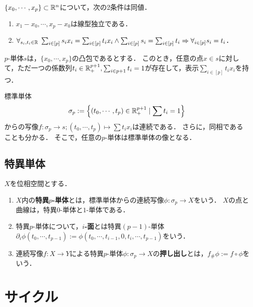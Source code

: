 \documentclass[uplatex,dvipdfmx]{jsreport}
\begin{document}
\begin{proposition}[単体の特徴付け]
    $\{x_0,\cdots,x_p\}\subset\mathbb{R}^n$について，次の2条件は同値．
    \begin{enumerate}
        \item $x_1-x_0,\cdots,x_p-x_0$は線型独立である．
        \item $\forall_{s_i,t_i\in\mathbb{R}}\;\sum_{i\in[p]}s_ix_i=\sum_{i\in[p]}t_ix_i\land\sum_{i\in[p]}s_i=\sum_{i\in[p]}t_i\Rightarrow\forall_{i\in[p]}s_i=t_i$．
    \end{enumerate}
\end{proposition}

\begin{corollary}
    $p$-単体$s$は，$\{x_0,\cdots,x_p\}$の凸包であるとする．
    このとき，任意の点$x\in s$に対して，ただ一つの係数列$t_i\in\mathbb{R}_+^{p+1},\sum_{i\in p+1}t_i=1$が存在して，表示$\sum_{i\in[p]}t_ix_i$を持つ．
\end{corollary}
\begin{remarks}
    標準単体
    \[\sigma_p:=\left\{(t_0,\cdots,t_p)\in\mathbb{R}_+^{p+1}\mid\sum t_i=1\right\}\]
    からの写像$f:\sigma_p\to s;(t_0,\cdots,t_p)\mapsto\sum t_ix_i$は連続である．
    さらに，同相であることも分かる．
    そこで，任意の$p$-単体は標準単体の像となる．
\end{remarks}

\subsection{特異単体}

\begin{definition}
    $X$を位相空間とする．
    \begin{enumerate}
        \item $X$内の\textbf{特異$p$-単体}とは，標準単体からの連続写像$\phi:\sigma_p\to X$をいう．
        $X$の点と曲線は，特異$0$-単体と$1$-単体である．
        \item 特異$p$-単体について，\textbf{$i$-面}とは特異$(p-1)$-単体$\partial_i\phi(t_0,\cdots,t_{p-1}):=\phi(t_0,\cdots,t_{i-1},0,t_i,\cdots,t_{p-1})$をいう．
        \item 連続写像$f:X\to Y$による特異$p$-単体$\phi:\sigma_p\to X$の\textbf{押し出し}とは，$f_\#\phi:=f\circ\phi$をいう．
    \end{enumerate}
\end{definition}

\section{サイクル}
\end{document}
